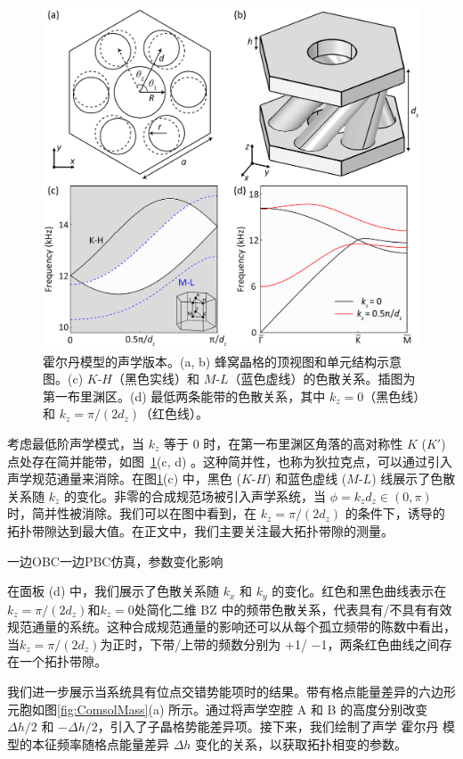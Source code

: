 \begin{figure}[htbp]
    \centering
    \includegraphics[width=0.65\linewidth]{figure/FracHaldExp/AcousticUnitCell.png}
    \caption{霍尔丹模型的声学版本。(a, b) 蜂窝晶格的顶视图和单元结构示意图。(c) $K$-$H$（黑色实线）和 $M$-$L$（蓝色虚线）的色散关系。插图为第一布里渊区。(d) 最低两条能带的色散关系，其中 $k_z = 0$（黑色线）和 $k_z = \pi/(2d_z)$（红色线）。}
    \label{fig:AcousticUnitCell}
\end{figure}

考虑最低阶声学模式，当 $k_z$ 等于 $0$ 时，在第一布里渊区角落的高对称性 $K$ ($K'$) 点处存在简并能带，如图~\ref{fig:AcousticUnitCell}(c, d) 。这种简并性，也称为狄拉克点，可以通过引入声学规范通量来消除。在图\ref{fig:AcousticUnitCell}(c) 中，黑色 ($K$-$H$) 和蓝色虚线 ($M$-$L$) 线展示了色散关系随 $k_z$ 的变化。非零的合成规范场被引入声学系统，当 $\phi = k_z d_z \in (0, \pi)$ 时，简并性被消除。我们可以在图中看到，在 $k_z = \pi/(2d_z)$ 的条件下，诱导的拓扑带隙达到最大值。在正文中，我们主要关注最大拓扑带隙的测量。

{\color{red}一边OBC一边PBC仿真，参数变化影响}

在面板 (d) 中，我们展示了色散关系随 $k_x$ 和 $k_y$ 的变化。红色和黑色曲线表示在$k_z=\pi/(2d_z)$和$k_z=0$处简化二维 BZ 中的频带色散关系，代表具有/不具有有效规范通量的系统。这种合成规范通量的影响还可以从每个孤立频带的陈数中看出，当$k_z=\pi/(2d_z)$为正时，下带/上带的频数分别为 +1/ −1，两条红色曲线之间存在一个拓扑带隙。

我们进一步展示当系统具有位点交错势能项时的结果。带有格点能量差异的六边形元胞如图\ref{fig:ComsolMass}(a) 所示。通过将声学空腔 A 和 B 的高度分别改变 $\Delta h/2$ 和 $-\Delta h/2$，引入了子晶格势能差异项。接下来，我们绘制了声学 霍尔丹 模型的本征频率随格点能量差异 $\Delta h$ 变化的关系，以获取拓扑相变的参数。

